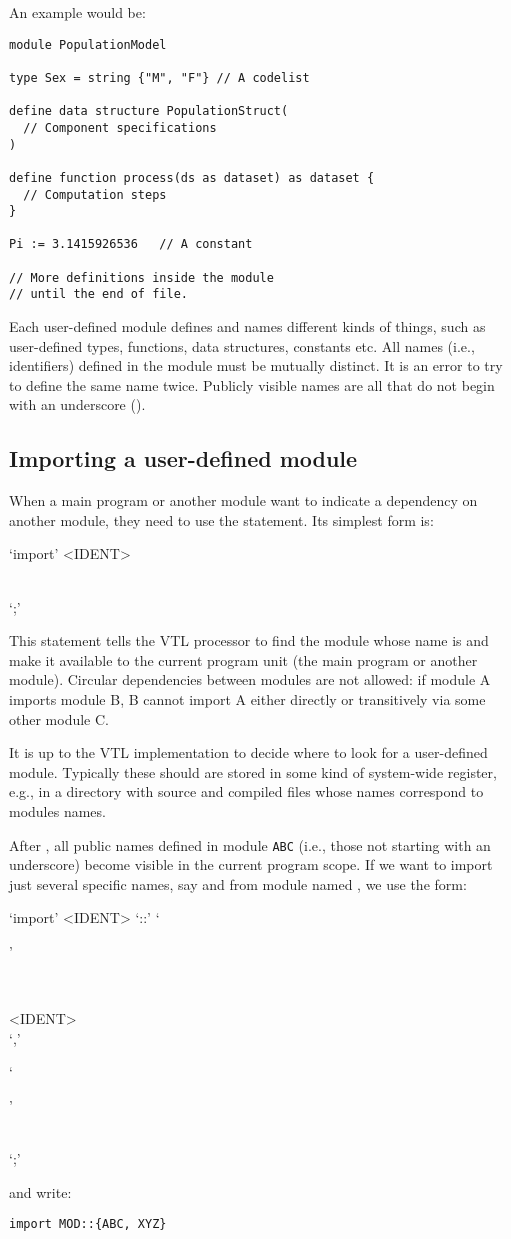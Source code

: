 \documentclass[droidmono,libertine,twoside,user,unofficial]{ecarticle}
\def\<#1>{\synt{#1}}
\newcommand{\optSemiCol}{\begin{stack}\\`;'\end{stack}}
\begin{document}
An example would be:
\begin{lstlisting}
module PopulationModel

type Sex = string {"M", "F"} // A codelist

define data structure PopulationStruct(
  // Component specifications
)

define function process(ds as dataset) as dataset {
  // Computation steps
}

Pi := 3.1415926536   // A constant

// More definitions inside the module
// until the end of file.
\end{lstlisting}

Each user-defined module defines and names different kinds of things,
such as user-defined types, functions, data structures, constants etc.
%
All names (i.e., identifiers) defined in the module must be mutually
distinct.  It is an error to try to define the same name twice.
Publicly visible names are all that do not begin with an underscore
(\lit{\_}).

\subsection{Importing a user-defined module}
\label{sec:importing-module}

When a main program or another module want to indicate a dependency on
another module, they need to use the  statement.  Its
simplest form is:
\begin{syntdiag}
  `import' <IDENT> \optSemiCol
\end{syntdiag}

This statement tells the VTL processor to find the module whose name
is \<IDENT> and make it available to the current program unit (the
main program or another module).  Circular dependencies between
modules are not allowed: if module A imports module B, B cannot import
A either directly or transitively via some other module C.

It is up to the VTL implementation to decide where to look for a
user-defined module.  Typically these should are stored in some kind
of system-wide register, e.g., in a directory with source and compiled
files whose names correspond to modules names.

After , all public names defined in module
\texttt{ABC} (i.e., those not starting with an underscore) become
visible in the current program scope.
%
If we want to import just several specific names, say  and
 from module named , we use the form:
\begin{syntdiag}
  `import' <IDENT> `::' `{'
    \begin{stack}
      \\
      \begin{rep}
        <IDENT> \\ `,'
      \end{rep}
    \end{stack}
    `}' \optSemiCol
\end{syntdiag}
and write:
\begin{lstlisting}
import MOD::{ABC, XYZ}
\end{lstlisting}
\end{document}
